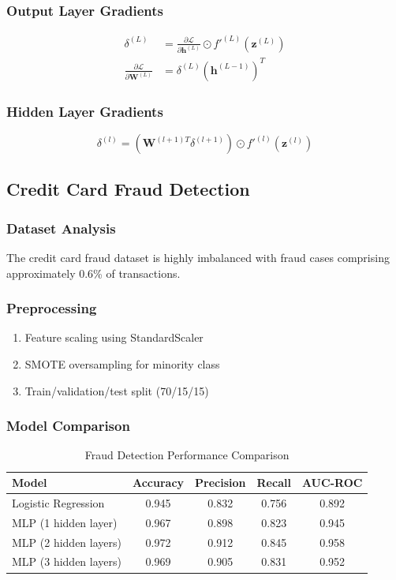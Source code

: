 \documentclass[conference]{IEEEtran}
\begin{document}
\subsubsection{Output Layer Gradients}
\begin{align}
\delta^{(L)} &= \frac{\partial \mathcal{L}}{\partial \mathbf{h}^{(L)}} \odot f'^{(L)}(\mathbf{z}^{(L)}) \\
\frac{\partial \mathcal{L}}{\partial \mathbf{W}^{(L)}} &= \delta^{(L)} (\mathbf{h}^{(L-1)})^T
\end{align}

\subsubsection{Hidden Layer Gradients}
\begin{equation}
\delta^{(l)} = (\mathbf{W}^{(l+1)T} \delta^{(l+1)}) \odot f'^{(l)}(\mathbf{z}^{(l)})
\end{equation}

\subsection{Credit Card Fraud Detection}
\subsubsection{Dataset Analysis}
The credit card fraud dataset is highly imbalanced with fraud cases comprising approximately 0.6\% of transactions.

\subsubsection{Preprocessing}
\begin{enumerate}
    \item Feature scaling using StandardScaler
    \item SMOTE oversampling for minority class
    \item Train/validation/test split (70/15/15)
\end{enumerate}

\subsubsection{Model Comparison}
\begin{table}[h]
\centering
\caption{Fraud Detection Performance Comparison}
\begin{tabular}{l c c c c}
\toprule
Model & Accuracy & Precision & Recall & AUC-ROC \\
\midrule
Logistic Regression & 0.945 & 0.832 & 0.756 & 0.892 \\
MLP (1 hidden layer) & 0.967 & 0.898 & 0.823 & 0.945 \\
MLP (2 hidden layers) & 0.972 & 0.912 & 0.845 & 0.958 \\
MLP (3 hidden layers) & 0.969 & 0.905 & 0.831 & 0.952 \\
\bottomrule
\end{tabular}
\label{tab:fraud_results}
\end{table}
\end{document}
